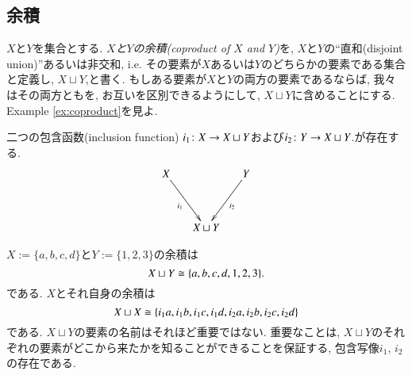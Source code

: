 \subsection{余積}\label{sec:coproducts}

\begin{definition}\label{def:coproduct}


$X$と$Y$を集合とする. \emph{$X$と$Y$の余積(coproduct of $X$ and $Y$)}を, $X$と$Y$の``直和(disjoint union)''あるいは非交和, i.e. その要素が$X$あるいは$Y$のどちらかの要素である集合と定義し, $X\sqcup Y$,と書く. もしある要素が$X$と$Y$の両方の要素であるならば, 我々はその両方ともを, お互いを区別できるようにして, $X\sqcup Y$に含めることにする. Example \ref{ex:coproduct}を見よ.


二つの包含函数(inclusion function) $i_1\colon X\rightarrow X\sqcup Y$および$i_2\colon Y\rightarrow X\sqcup Y$.が存在する.
$$\xymatrix@=15pt{X\ar[ddr]_{i_1}&&Y\ar[ddl]^{i_2}\\\\&X\sqcup Y}$$

\end{definition}

\begin{example}\label{ex:coproduct}


$X:=\{a,b,c,d\}$と$Y:=\{1,2,3\}$の余積は$$X\sqcup Y\cong\{a,b,c,d,1,2,3\}.$$である. $X$とそれ自身の余積は$$X\sqcup X\cong\{i_1a,i_1b,i_1c,i_1d,i_2a,i_2b,i_2c,i_2d\}$$である.
$X\sqcup Y$の要素の名前はそれほど重要ではない. 重要なことは, $X\sqcup Y$のそれぞれの要素がどこから来たかを知ることができることを保証する, 包含写像$i_1$, $i_2$の存在である.

\end{example}

